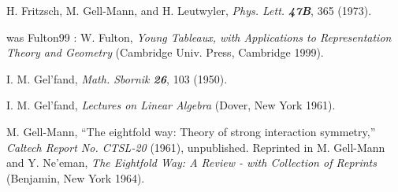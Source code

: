 

H. Fritzsch, M. Gell-Mann, and H. Leutwyler,
{\em Phys. Lett.  \bf 47B}, 365 (1973).



was Fulton99 :
 W. Fulton,
     {\em Young Tableaux, with Applications to
          Representation Theory and Geometry}
        (Cambridge Univ. Press, Cambridge  1999).


 I. M. Gel'fand,
    {\em Math. Sbornik \bf 26}, 103 (1950).

 I. M. Gel'fand,
        {\em Lectures on Linear Algebra}
        (Dover, New York 1961).


 M. Gell-Mann,
    ``The eightfold way: Theory of strong interaction symmetry,''
    {\em Caltech Report No. CTSL-20} (1961), unpublished.
    Reprinted in M. Gell-Mann and Y. Ne'eman,
    {\em The Eightfold Way: A Review - with Collection of Reprints}
    (Benjamin, New York 1964).
%

%

